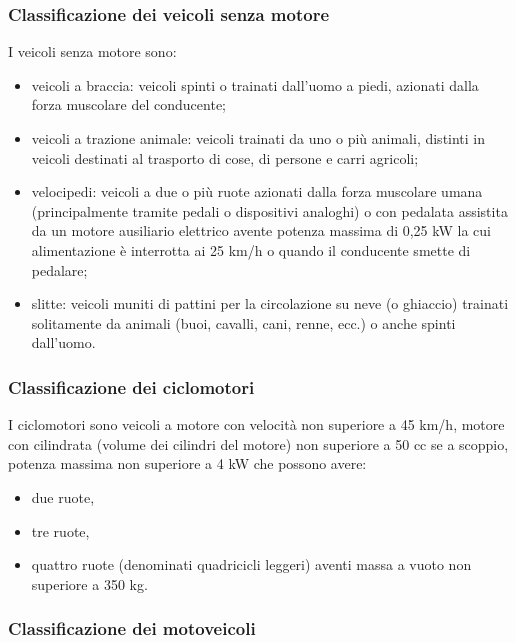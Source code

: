 	      \subsubsection{Classificazione dei veicoli senza motore}
	      
	      I veicoli senza motore sono:
	      \begin{itemize}
	      	\item veicoli a braccia: veicoli spinti o trainati dall'uomo a piedi, azionati dalla forza muscolare del conducente;
	      	      
	      	\item veicoli a trazione animale: veicoli trainati da uno o più animali, distinti in veicoli destinati al trasporto di cose, di persone e carri agricoli;
	      	      
	      	\item velocipedi: veicoli a due o più ruote azionati dalla forza muscolare umana (principalmente tramite pedali o dispositivi analoghi) o con pedalata assistita da un motore ausiliario elettrico avente potenza massima di 0,25 kW la cui alimentazione è interrotta ai 25 km/h o quando il conducente smette di pedalare;
	      	      
	      	\item slitte: veicoli muniti di pattini per la circolazione su neve (o ghiaccio) trainati solitamente da animali (buoi, cavalli, cani, renne, ecc.) o anche spinti dall'uomo.
	      \end{itemize}
	      
	      \subsubsection{Classificazione dei ciclomotori}
	      
	      I ciclomotori sono veicoli a motore con velocità non superiore a 45 km/h, motore con cilindrata (volume dei cilindri del motore) non superiore a 50 cc se a scoppio, potenza massima non superiore a 4 kW che possono avere:
	      \begin{itemize}
	      	\item due ruote,
	      	\item tre ruote,
	      	\item quattro ruote (denominati quadricicli leggeri) aventi massa a vuoto non superiore a 350 kg.
	      \end{itemize}
	      
	      \subsubsection{Classificazione dei motoveicoli}
	      
